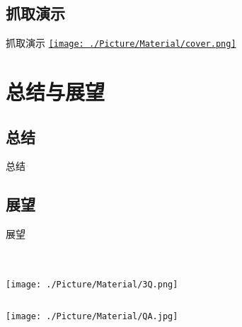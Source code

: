 \documentclass[xcolor=table,compress,blue]{beamer}
\begin{document}
	\subsection{抓取演示}
	
	\begin{frame}{抓取演示}
			\href{./Video/demo-grasping.mp4}{\texttt{[image: ./Picture/Material/cover.png]}}
	\end{frame}	


\section{总结与展望}	
\subsection{总结}
\begin{frame}{总结}
	
\end{frame}	
\subsection{展望}
\begin{frame}{展望}
	
\end{frame}	


\section{}
\begin{frame}[plain]
	\thispagestyle{empty}
	\begin{columns}
		\begin{column}{\paperwidth}
			\texttt{[image: ./Picture/Material/3Q.png]}
		\end{column}
	\end{columns}
\end{frame}
\begin{frame}[plain]
	\thispagestyle{empty}
	\begin{columns}
		\begin{column}{\paperwidth}
			\texttt{[image: ./Picture/Material/QA.jpg]}
		\end{column}
	\end{columns}
\end{frame}
\end{document}
